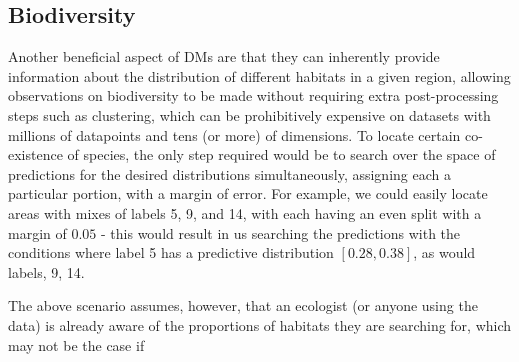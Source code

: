 \subsection{Biodiversity}

Another beneficial aspect of DMs are that they can inherently provide information about the distribution of different habitats in a given region, allowing observations on biodiversity to be made without requiring extra post-processing steps such as clustering, which can be prohibitively expensive on datasets with millions of datapoints and tens (or more) of dimensions. To locate certain co-existence of species, the only step required would be to search over the space of predictions for the desired distributions simultaneously, assigning each a particular portion, with a margin of error. For example, we could easily locate areas with mixes of  labels 5, 9, and 14, with each having an even split with a margin of $0.05$ - this would result in us searching the predictions with the conditions where label 5 has a predictive distribution $[0.28, 0.38]$, as would labels, 9, 14. 


The above scenario assumes, however, that an ecologist (or anyone using the data) is already aware of the proportions of habitats they are searching for, which may not be the case if 
